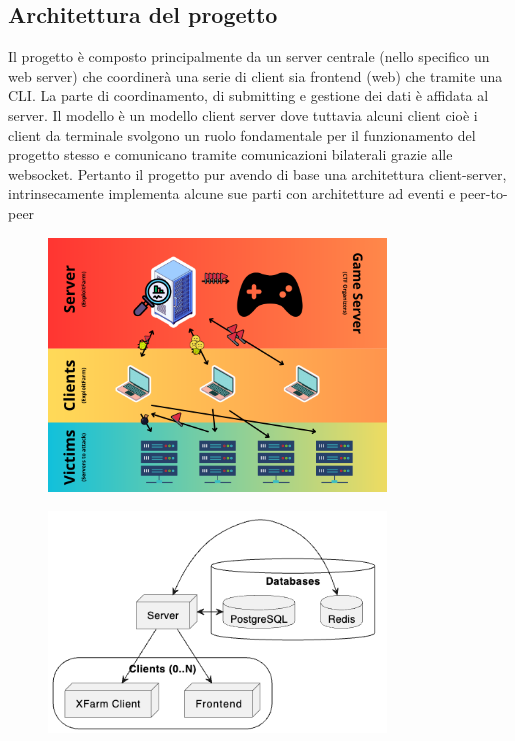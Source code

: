 \documentclass[11pt]{article}
\begin{document}
\subsection{Architettura del progetto}
Il progetto è composto principalmente da un server centrale (nello specifico un web server) che coordinerà una serie di client sia frontend (web) che tramite una CLI. La parte di coordinamento, di submitting e gestione dei dati è affidata al server. Il modello è un modello client server dove tuttavia alcuni client cioè i client da terminale svolgono un ruolo fondamentale per il funzionamento del progetto stesso e comunicano tramite comunicazioni bilaterali grazie alle websocket. Pertanto il progetto pur avendo di base una architettura client-server, intrinsecamente implementa alcune sue parti con architetture ad eventi e peer-to-peer
    \begin{figure}[H]
    	\centering
    	\includegraphics[width=0.8\textwidth]{general_layout.png}
	\end{figure}
	\begin{figure}[H]
    	\centering
    	\includegraphics[width=0.8\textwidth]{Architecture.png}
	\end{figure}
\end{document}
